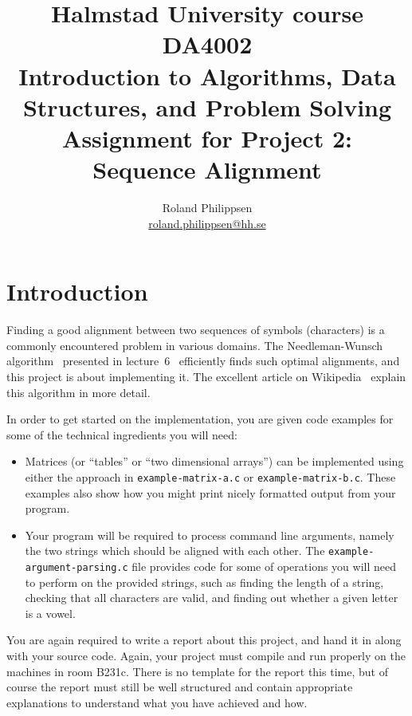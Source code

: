 \documentclass[a4paper,10pt]{article}
\begin{document}
\title{
  {\small
    Halmstad University course DA4002\\
    Introduction to Algorithms, Data Structures, and Problem Solving\\
  }
  Assignment for Project 2:\\
  Sequence Alignment
}
\author{
  Roland Philippsen\\
  \url{roland.philippsen@hh.se}
}
\maketitle



\section{Introduction}

Finding a good alignment between two sequences of symbols (characters) is a commonly encountered problem in various domains.
The Needleman-Wunsch algorithm~\cite{needleman-wunsch:1970} presented in lecture~6~\cite{lecture6} efficiently finds such optimal alignments, and this project is about implementing it.
The excellent article on Wikipedia~\cite{wikipedia:needleman-wunsch} explain this algorithm in more detail.

In order to get started on the implementation, you are given code examples for some of the technical ingredients you will need:
\begin{itemize}
\item
  Matrices (or ``tables'' or ``two dimensional arrays'') can be implemented using either the approach in \texttt{example-matrix-a.c} or \texttt{example-matrix-b.c}.
  These examples also show how you might print nicely formatted output from your program.
\item
  Your program will be required to process command line arguments, namely the two strings which should be aligned with each other.
  The \texttt{example-argument-parsing.c} file provides code for some of operations you will need to perform on the provided strings, such as finding the length of a string, checking that all characters are valid, and finding out whether a given letter is a vowel.
\end{itemize}

You are again required to write a report about this project, and hand it in along with your source code.
Again, your project must compile and run properly on the machines in room B231c.
There is no template for the report this time, but of course the report must still be well structured and contain appropriate explanations to understand what you have achieved and how.
\end{document}
